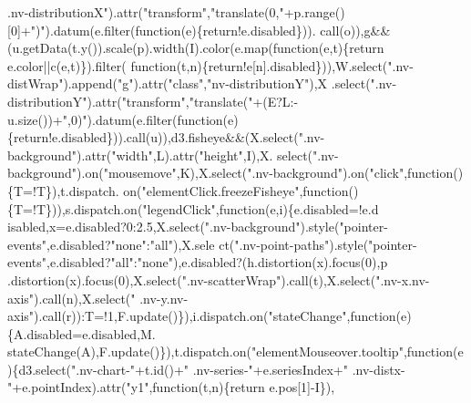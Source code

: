 \begin{DoxyCode}
{      .nv-distributionX"}).attr(\textcolor{stringliteral}{"transform"},\textcolor{stringliteral}{"translate(0,"}+p.range()[0]+\textcolor{stringliteral}{")"}).datum(e.filter(\textcolor{keyword}{function}(e)\{return!e.disabled\})).
      call(o)),g&&(u.getData(t.y()).scale(p).width(I).color(e.map(\textcolor{keyword}{function}(e,t)\{return e.color||c(e,t)\}).filter(\textcolor{keyword}{
      function}(t,n)\{\textcolor{keywordflow}{return}!e[n].disabled\})),W.select(\textcolor{stringliteral}{".nv-distWrap"}).append(\textcolor{stringliteral}{"g"}).attr(\textcolor{stringliteral}{"class"},\textcolor{stringliteral}{"nv-distributionY"}),X
      .select(\textcolor{stringliteral}{".nv-distributionY"}).attr(\textcolor{stringliteral}{"transform"},\textcolor{stringliteral}{"translate("}+(E?L:-u.size())+\textcolor{stringliteral}{",0)"}).datum(e.filter(\textcolor{keyword}{function}(e)
      \{return!e.disabled\})).call(u)),d3.fisheye&&(X.select(\textcolor{stringliteral}{".nv-background"}).attr(\textcolor{stringliteral}{"width"},L).attr(\textcolor{stringliteral}{"height"},I),X.
      select(\textcolor{stringliteral}{".nv-background"}).on(\textcolor{stringliteral}{"mousemove"},K),X.select(\textcolor{stringliteral}{".nv-background"}).on(\textcolor{stringliteral}{"click"},\textcolor{keyword}{function}()\{T=!T\}),t.dispatch.
      on(\textcolor{stringliteral}{"elementClick.freezeFisheye"},\textcolor{keyword}{function}()\{T=!T\})),s.dispatch.on(\textcolor{stringliteral}{"legendClick"},\textcolor{keyword}{function}(e,i)\{e.disabled=!e.d
      isabled,x=e.disabled?0:2.5,X.select(\textcolor{stringliteral}{".nv-background"}).style(\textcolor{stringliteral}{"pointer-events"},e.disabled?\textcolor{stringliteral}{"none"}:\textcolor{stringliteral}{"all"}),X.sele
      ct(\textcolor{stringliteral}{".nv-point-paths"}).style(\textcolor{stringliteral}{"pointer-events"},e.disabled?\textcolor{stringliteral}{"all"}:\textcolor{stringliteral}{"none"}),e.disabled?(h.distortion(x).focus(0),p
      .distortion(x).focus(0),X.select(\textcolor{stringliteral}{".nv-scatterWrap"}).call(t),X.select(\textcolor{stringliteral}{".nv-x.nv-axis"}).call(n),X.select(\textcolor{stringliteral}{"
      .nv-y.nv-axis"}).call(r)):T=!1,F.update()\}),i.dispatch.on(\textcolor{stringliteral}{"stateChange"},\textcolor{keyword}{function}(e)\{A.disabled=e.disabled,M.
      stateChange(A),F.update()\}),t.dispatch.on(\textcolor{stringliteral}{"elementMouseover.tooltip"},\textcolor{keyword}{function}(e)\{d3.select(\textcolor{stringliteral}{".nv-chart-"}+t.id()+\textcolor{stringliteral}{"
       .nv-series-"}+e.seriesIndex+\textcolor{stringliteral}{" .nv-distx-"}+e.pointIndex).attr(\textcolor{stringliteral}{"y1"},function(t,n)\{return e.pos[1]-I\}),

\end{DoxyCode}
